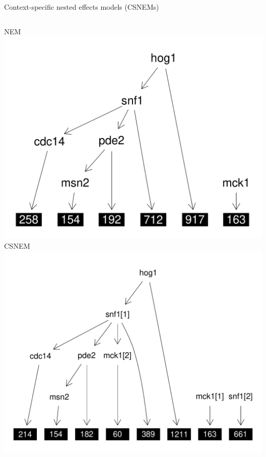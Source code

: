 \documentclass{beamer}
\begin{document}
\begin{frame}{Context-specific nested effects models (CSNEMs)}
\begin{columns}
NEM
\includegraphics[width=\textwidth]{nem}
CSNEM
\includegraphics[width=\textwidth]{csnem}
\end{columns}
\end{frame}
\end{document}
